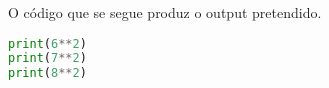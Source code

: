 \documentclass[12pt,varwidth=16cm,border=17pt]{standalone}
\begin{document}
O código que se segue produz o output pretendido. 

\begin{lstlisting}[language=Python]
print(6**2)
print(7**2)
print(8**2)
\end{lstlisting}
\end{document}
